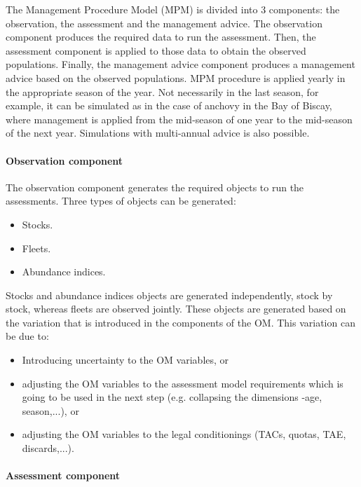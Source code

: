   The Management Procedure Model (MPM) is divided into 3 components: the observation, the assessment and the management advice. The observation 
  component produces the required data to run the assessment. Then, the assessment component is applied to those data to obtain the observed 
  populations. Finally, the management advice component produces a management advice based on the observed populations. MPM procedure is applied 
  yearly in the appropriate season of the year. Not necessarily in the last season, for example, it can be simulated as in the case of anchovy in 
  the Bay of Biscay, where management is applied from the mid-season of one year to the mid-season of the next year. Simulations with multi-annual 
  advice is also possible.

\paragraph{Observation component} \hspace{0pt} \smallskip

  The observation component generates the required objects to run the assessments. Three types of objects can be generated:
  
  \begin{itemize}
  	\item Stocks. 
  	\item Fleets. 
  	\item Abundance indices.
  \end{itemize}
  
  Stocks and abundance indices objects are generated independently, stock by stock, whereas fleets are observed jointly. 
  These objects are generated based on the variation that is introduced in the components of the OM. This variation can be due to:
  
  \begin{itemize}
  	\item Introducing uncertainty to the OM variables, or
  	\item adjusting the OM variables to the assessment model requirements which is going to be used in the next step (e.g. collapsing the dimensions -age, season,...), or
  		\item adjusting the OM variables to the legal conditionings (TACs, quotas, TAE, discards,...).
  \end{itemize}
 
\paragraph{Assessment component} \hspace{0pt} \smallskip

